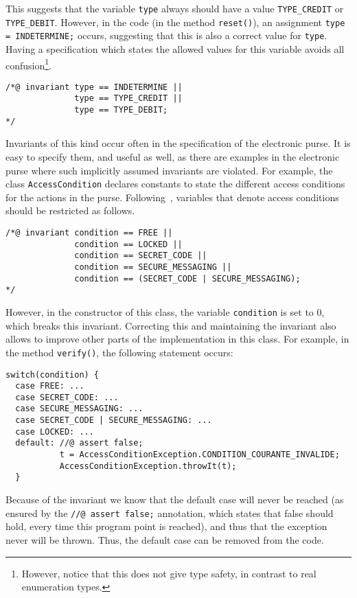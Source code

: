 \documentclass[a4paper]{llncs}
\begin{document}
This suggests that the variable \texttt{type} always should have a
value \texttt{TYPE\_CREDIT} or \texttt{TYPE\_DEBIT}. However, in the
code (in the method \texttt{reset()}), an assignment \texttt{type =
INDETERMINE;} occurs, suggesting that this is also a correct value for 
\texttt{type}. Having a specification which states the allowed values
for this variable avoids all confusion\footnote{However, notice that
this does not give type safety, in contrast to real enumeration types.}.
\begin{verbatim}
/*@ invariant type == INDETERMINE ||
              type == TYPE_CREDIT || 
              type == TYPE_DEBIT;
*/
\end{verbatim}

Invariants of this kind occur often in the specification of the
electronic purse. It is easy to specify them, and useful as well, as
there are examples in the electronic purse where such implicitly assumed
invariants are violated.
For example, the class \texttt{AccessCondition} declares constants to
state the different access conditions for the actions in the
purse. Following~\cite{BretagneMGL00}, variables that denote access conditions
should be restricted as follows.
\begin{verbatim}
/*@ invariant condition == FREE ||
              condition == LOCKED ||
              condition == SECRET_CODE ||
              condition == SECURE_MESSAGING ||
              condition == (SECRET_CODE | SECURE_MESSAGING);
*/
\end{verbatim}

However, in the constructor of this class, the variable
\texttt{condition} is set to 0, which breaks this
invariant. Correcting this and maintaining the invariant also allows
to improve other parts of the implementation in this class. For
example, in the method \texttt{verify()}, the following statement
occurs:
\begin{verbatim}
switch(condition) {
  case FREE: ...
  case SECRET_CODE: ...
  case SECURE_MESSAGING: ...
  case SECRET_CODE | SECURE_MESSAGING: ...
  case LOCKED: ...
  default: //@ assert false;
           t = AccessConditionException.CONDITION_COURANTE_INVALIDE;
           AccessConditionException.throwIt(t);
  }
\end{verbatim}
Because of the invariant we know that the default case will never
be reached (as ensured by the \texttt{//@ assert false;} annotation,
which states that false should hold, every time this program point is
reached), and thus that the exception never will be thrown. Thus, the
default case can be removed from the code.
\end{document}
